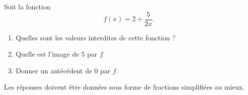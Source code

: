
\begin{exercice}\label{exosmath-0364}

    Soit la fonction
    \begin{equation}
        f(x)=2+\frac{ 5 }{ 2x }.
    \end{equation}
    \begin{enumerate}
        \item
            Quelles sont les valeurs interdites de cette fonction ?
        \item
            Quelle est l'image de \( 5\) par \( f\).
        \item
            Donner un antécédent de \( 0\) par \( f\).
    \end{enumerate}
    Les réponses doivent être données sous forme de fractions simplifiées au mieux.

\end{exercice}
